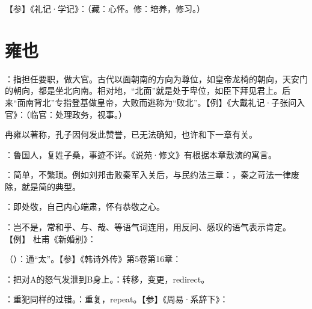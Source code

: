 {
【参】《礼记·学记》：（藏：心怀。修：培养，修习。）
}
{}



\chapter{雍也}

{
\item {}：指担任要职，做大官。古代以面朝南的方向为尊位，如皇帝龙椅的朝向，天安门的朝向，都是坐北向南。相对地，“北面”就是处于卑位，如臣下拜见君上。后来“面南背北”专指登基做皇帝，大败而逃称为“败北”。【例】《大戴礼记·子张问入官》：（临官：处理政务，视事。）

冉雍以著称，孔子因何发此赞誉，已无法确知，也许和下一章有关。
}
{}


{
\item {}：鲁国人，复姓子桑，事迹不详。《说苑·修文》有根据本章敷演的寓言。
\item {}：简单，不繁琐。例如刘邦击败秦军入关后，与民约法三章：，秦之苛法一律废除，就是简的典型。
\item {}：即处敬，自己内心端肃，怀有恭敬之心。
\item {}：岂不是，常和乎、与、哉、等语气词连用，用反问、感叹的语气表示肯定。【例】 杜甫《新婚别》：
\item {}（）：通“太”。【参】《韩诗外传》第5卷第16章：
}
{}


{
\item {}：把对A的怒气发泄到B身上。：转移，变更，redirect。
\item {}：重犯同样的过错。：重复，repeat。【参】《周易·系辞下》：
}
{}



